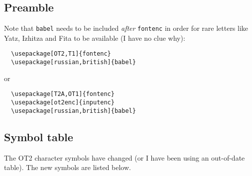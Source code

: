 \documentclass[\mydriver,12pt,twoside,notitlepage,a4paper]{article}
\begin{document}
\thispagestyle{empty}

\subsection*{Preamble}
Note that \verb|babel| needs to be included \emph{after} \verb|fontenc| in
order for rare letters like Yatz, Izhitza and Fita to be available (I have
no clue why):
\begin{verbatim}
  \usepackage[OT2,T1]{fontenc}
  \usepackage[russian,british]{babel}
\end{verbatim}
or
\begin{verbatim}
  \usepackage[T2A,OT1]{fontenc}
  \usepackage[ot2enc]{inputenc}
  \usepackage[russian,british]{babel}
\end{verbatim}

\clearpage
\subsection*{Symbol table}
The OT2 character symbols have changed (or I have been using an
out-of-date table). The new symbols are listed below.
\end{document}
